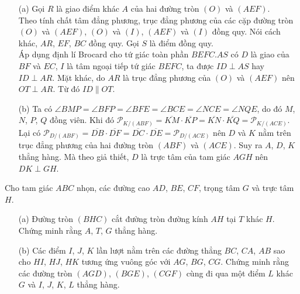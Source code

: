     \begin{solution}
        \hfill
        \begin{enumerate}
            \item[(a)] Gọi \(R\) là giao điểm khác \(A\) của hai đường tròn \((O)\) và \((AEF)\).\\
            Theo tính chất tâm đẳng phương, trục đẳng phương của các cặp đường tròn \((O)\) và \((AEF)\), \((O)\) và \((I)\), \((AEF)\) và \((I)\) đồng quy. Nói cách khác, \(AR\), \(EF\), \(BC\) đồng quy. Gọi \(S\) là điểm đồng quy.\\
            Áp dụng định lí Brocard cho tứ giác toàn phần \(BEFC.AS\) có \(D\) là giao của \(BF\) và \(EC\), \(I\) là tâm ngoại tiếp tứ giác \(BEFC\), ta được \(ID \perp AS\) hay \(ID \perp AR\). Mặt khác, do \(AR\) là trục đẳng phương của \((O)\) và \((AEF)\) nên \(OT \perp AR\). Từ đó \(ID \parallel OT\).
            \item[(b)] Ta có \(\angle BMP = \angle BFP = \angle BFE = \angle BCE = \angle NCE = \angle NQE\), do đó \(M\), \(N\), \(P\), \(Q\) đồng viên. Khi đó \(\mathcal{P}_{K/(ABF)} = \overline{KM} \cdot \overline{KP} = \overline{KN} \cdot \overline{KQ} = \mathcal{P}_{K/(ACE)}\). Lại có \(\mathcal{P}_{D/(ABF)} = \overline{DB} \cdot \overline{DF} = \overline{DC} \cdot \overline{DE} = \mathcal{P}_{D/(ACE)}\) nên \(D\) và \(K\) nằm trên trục đẳng phương của hai đường tròn \((ABF)\) và \((ACE)\). Suy ra \(A\), \(D\), \(K\) thẳng hàng. Mà theo giả thiết, \(D\) là trực tâm của tam giác \(AGH\) nên \(DK \perp GH\).
        \end{enumerate}
    \end{solution}

    \begin{problem}
        Cho tam giác \(ABC\) nhọn, các đường cao \(AD\), \(BE\), \(CF\), trọng tâm \(G\) và trực tâm \(H\).
        \begin{enumerate}
            \item[(a)] Đường tròn \((BHC)\) cắt đường tròn đường kính \(AH\) tại \(T\) khác \(H\). Chứng minh rằng \(A\), \(T\), \(G\) thẳng hàng.
            \item[(b)] Các điểm \(I\), \(J\), \(K\) lần lượt nằm trên các đường thẳng \(BC\), \(CA\), \(AB\) sao cho \(HI\), \(HJ\), \(HK\) tương ứng vuông góc với \(AG\), \(BG\), \(CG\). Chứng minh rằng các đường tròn \((AGD)\), \((BGE)\), \((CGF)\) cùng đi qua một điểm \(L\) khác \(G\) và \(I\), \(J\), \(K\), \(L\) thẳng hàng.
        \end{enumerate}
    \end{problem}

